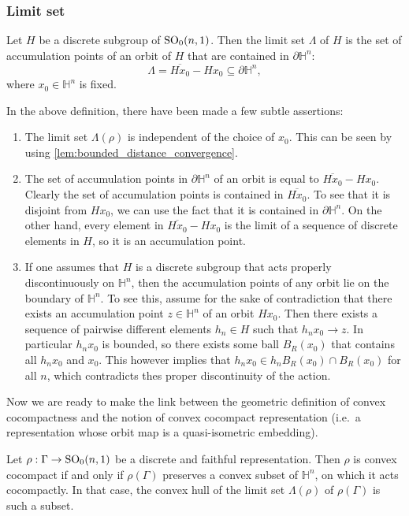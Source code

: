 \documentclass{report}
\begin{document}
\subsubsection{Limit set}
\begin{definition}
    Let $H$ be a discrete subgroup of $\operatorname{{\mathrm{SO}}}_0(n,1)$.
    Then the limit set $\Lambda$ of $H$ is the set of accumulation points of an orbit of $H$ that are contained in $\partial \mathbb H^n$:
    \[
    \Lambda = \overline{H x_0} - H x_0 \subseteq \partial \mathbb H^n,
    \]
    where $x_0 \in \mathbb H^n$ is fixed.
\end{definition}
\begin{remark}
    In the above definition, there have been made a few subtle assertions:
    \begin{enumerate}[label=(\roman*)]
        \item The limit set $\Lambda(\rho)$ is independent of the choice of $x_0$.
        This can be seen by using \cref{lem:bounded_distance_convergence}.
        \item The set of accumulation points in $\partial \mathbb H^n$ of an orbit is equal to $\overline{H x_0} - H x_0$.
        Clearly the set of accumulation points is contained in $\overline{H x_0}$.
        To see that it is disjoint from $H x_0$, we can use the fact that it is contained in $\partial \mathbb H^n$.
        On the other hand, every element in $\overline{H x_0} - H x_0$ is the limit of a sequence of discrete elements in $H$, so it is an accumulation point.
        \item \label{rem:limit_set_properly_discontinuous}If one assumes that $H$ is a discrete subgroup that acts properly discontinuously on $\mathbb H^n$, then the accumulation points of any orbit lie on the boundary of $\mathbb H^n$.
        To see this, assume for the sake of contradiction that there exists an accumulation point $z \in \mathbb H^n$ of an orbit $H x_0$.
        Then there exists a sequence of pairwise different elements $h_n \in H$ such that $h_n x_0 \to z$.
        In particular $h_n x_0$ is bounded, so there exists some ball $B_R(x_0)$ that contains all $h_n x_0$ and $x_0$.
        This however implies that $h_n x_0 \in h_n B_{R}(x_0) \cap B_R(x_0)$ for all $n$, which contradicts thes proper discontinuity of the action.
    \end{enumerate}
\end{remark}
Now we are ready to make the link between the geometric definition of convex cocompactness and the notion of convex cocompact representation (i.e.\ a representation whose orbit map is a quasi-isometric embedding).
\begin{proposition}\label{prop:convex_cocompact_limit_set}
    Let $\rho: \Gamma \to \operatorname{{\mathrm{SO}}}_0(n,1)$ be a discrete and faithful representation.
    Then $\rho$ is convex cocompact if and only if $\rho(\Gamma)$ preserves a convex subset of $\mathbb H^n$, on which it acts cocompactly.
    In that case, the convex hull of the limit set $\Lambda(\rho)$ of $\rho(\Gamma)$ is such a subset.
\end{proposition}
\end{document}
